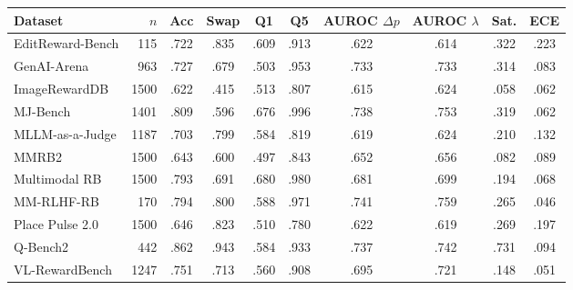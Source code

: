 \begin{tabular}{lrcccccccc}
\toprule
Dataset & $n$ & Acc & Swap & Q1 & Q5 & AUROC $\Delta p$ & AUROC $\lambda$ & Sat. & ECE\\
\midrule
EditReward-Bench & 115 & .722 & .835 & .609 & .913 & .622 & .614 & .322 & .223\\
GenAI-Arena & 963 & .727 & .679 & .503 & .953 & .733 & .733 & .314 & .083\\
ImageRewardDB & 1500 & .622 & .415 & .513 & .807 & .615 & .624 & .058 & .062\\
MJ-Bench & 1401 & .809 & .596 & .676 & .996 & .738 & .753 & .319 & .062\\
MLLM-as-a-Judge & 1187 & .703 & .799 & .584 & .819 & .619 & .624 & .210 & .132\\
MMRB2 & 1500 & .643 & .600 & .497 & .843 & .652 & .656 & .082 & .089\\
Multimodal RB & 1500 & .793 & .691 & .680 & .980 & .681 & .699 & .194 & .068\\
MM-RLHF-RB & 170 & .794 & .800 & .588 & .971 & .741 & .759 & .265 & .046\\
Place Pulse 2.0 & 1500 & .646 & .823 & .510 & .780 & .622 & .619 & .269 & .197\\
Q-Bench2 & 442 & .862 & .943 & .584 & .933 & .737 & .742 & .731 & .094\\
VL-RewardBench & 1247 & .751 & .713 & .560 & .908 & .695 & .721 & .148 & .051\\
\bottomrule
\end{tabular}

